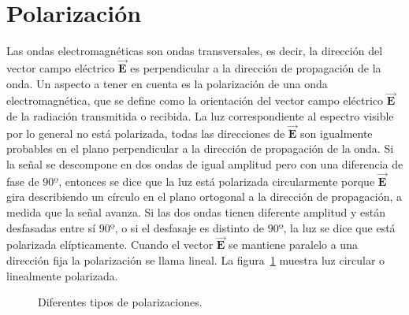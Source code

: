 \section{Polarización}

Las ondas electromagnéticas son ondas transversales, es decir, la dirección del vector campo eléctrico $\vec{\mathbf{E}}$ es perpendicular a la dirección de propagación de la onda. Un aspecto a tener en cuenta es la polarización de una onda electromagnética, que se define como la orientación del vector campo eléctrico $\vec{\mathbf{E}}$ de la radiación transmitida o recibida. La luz correspondiente al espectro visible por lo general no está polarizada, todas las direcciones de $\vec{\mathbf{E}}$ son igualmente probables en el plano perpendicular a la dirección de propagación de la onda. Si la señal se descompone en dos ondas de igual amplitud pero con una diferencia de fase de $90º$, entonces se dice que la luz está polarizada circularmente porque $\vec{\mathbf{E}}$ gira describiendo un círculo en el plano ortogonal a la dirección de propagación, a medida que la señal avanza. Si las dos ondas tienen diferente amplitud y están desfasadas entre sí $90º$, o si el desfasaje es distinto de $90º$, la luz se dice que está polarizada elípticamente. Cuando el vector $\vec{\mathbf{E}}$ se mantiene paralelo a una dirección fija la polarización se llama lineal. La figura~\ref{PolarizacionCircularLineal} muestra luz  circular o linealmente polarizada.

\begin{figure}[hbt]
	\centering    
	 \qquad
	\caption{\label{PolarizacionCircularLineal}Diferentes tipos de polarizaciones.}
\end{figure} 

